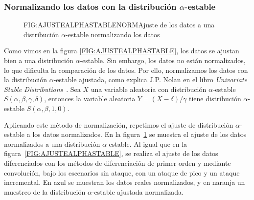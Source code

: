 \subsubsection{Normalizando los datos con la distribución $\alpha$-estable}\label{SUBSEC:NORMALIZACIONALPHASTABLE}

\begin{figure}[Ajuste de los datos a una distribución $\alpha$-estable normalizando los datos]{FIG:AJUSTEALPHASTABLENORM}{Ajuste de los datos a una distribución $\alpha$-estable normalizando los datos}
    \label{FIG:AJUSTEALPHASTABLENORM}
\end{figure}

Como vimos en la figura \ref{FIG:AJUSTEALPHASTABLE}, los datos se ajustan bien a una distribución $\alpha$-estable. Sin embargo, los datos no están normalizados, lo que dificulta la comparación de los datos. Por ello, normalizamos los datos con la distribución $\alpha$-estable ajustada, como explica J.P. Nolan en el libro \textit{Univariate Stable Distributions}~\cite{nolan2020univariate}. Sea $X$ una variable aleatoria con distribución $\alpha$-estable $S(\alpha, \beta, \gamma, \delta)$, entonces la variable aleatoria $Y = (X - \delta) / \gamma$ tiene distribución $\alpha$-estable $S(\alpha, \beta, 1, 0)$.

Aplicando este método de normalización, repetimos el ajuste de distribución $\alpha$-estable a los datos normalizados. En la figura~\ref{FIG:AJUSTEALPHASTABLENORM} se muestra el ajuste de los datos normalizados a una distribución $\alpha$-estable. Al igual que en la figura~\ref{FIG:AJUSTEALPHASTABLE}, se realiza el ajuste de los datos diferenciados con los métodos de diferenciación de primer orden y mediante convolución, bajo los escenarios sin ataque, con un ataque de pico y un ataque incremental. En azul se muestran los datos reales normalizados, y en naranja un muestreo de la distribución $\alpha$-estable ajustada normalizada.


